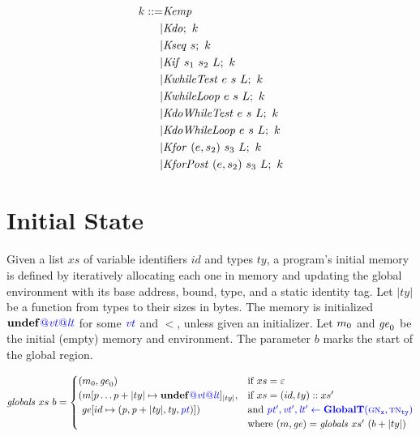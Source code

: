\documentclass{llncs}
\begin{document}
\[\begin{split}
k ::= & \mathit{Kemp} \\
| & \mathit{Kdo};~ k \\
| & \mathit{Kseq} ~ s; ~ k \\
| & \mathit{Kif} ~ s_1 ~ s_2 ~ L; ~ k \\
| & \mathit{KwhileTest} ~ e ~ s ~ L; ~ k \\
| & \mathit{KwhileLoop} ~ e ~ s ~ L; ~ k \\
| & \mathit{KdoWhileTest} ~ e ~ s ~ L; ~ k \\
| & \mathit{KdoWhileLoop} ~ e ~ s ~ L; ~ k \\
| & \mathit{Kfor} ~ (e,s_2) ~ s_3 ~ L ; ~ k \\
| & \mathit{KforPost} ~ (e,s_2) ~ s_3 ~ L ; ~ k \\
\end{split}\]



\section{Initial State}

Given a list \(xs\) of variable identifiers \(id\) and types
\(ty\), a program's initial memory is defined by iteratively allocating each one
in memory and updating the global environment with its base address, bound, type,
and a static identity tag. Let \(|ty|\) be a function from types to their sizes
in bytes. The memory is initialized \(\mathbf{undef}{\color{blue} @}\mathit{\color{blue} vt}{\color{blue} @}\mathit{\color{blue} lt}\)
for some \(\mathit{\color{blue} vt}\) and \(\lt\), unless given an initializer.
Let \(m_0\) and \(\mathit{ge}_0\) be the initial (empty) memory and environment.
The parameter \(b\) marks the start of the global region.


\[\mathit{globals} ~ xs ~ b =
\begin{cases}
  (m_0, \mathit{ge}_0) & \textnormal{if } xs = \varepsilon \\
  (m[p \dots p+|ty| \mapsto \mathbf{undef}{\color{blue} @}\mathit{\color{blue} vt}{\color{blue} @}\mathit{\color{blue} lt}]_{|ty|}, & \textnormal{if } xs = (id,ty)::xs' \\
  ~ \mathit{ge}[id \mapsto (\mathit{p, p+|ty|,ty,\mathit{\color{blue} pt}})]) & \textnormal{and } {\color{blue} \mathit{\color{blue} pt'},\mathit{\color{blue} vt'},\mathit{\color{blue} lt'}\leftarrow \color{blue} \mathbf{GlobalT}({\color{blue} \textnormal{\sc gn}_{\mathtt{x}}}, {\color{blue} \textnormal{\sc tn}_{\mathtt{ty}}})} \\
  & \textnormal{where } (m,\mathit{ge}) = \mathit{globals} ~ xs' ~ (b + |ty|) \\
\end{cases}\]
\end{document}

